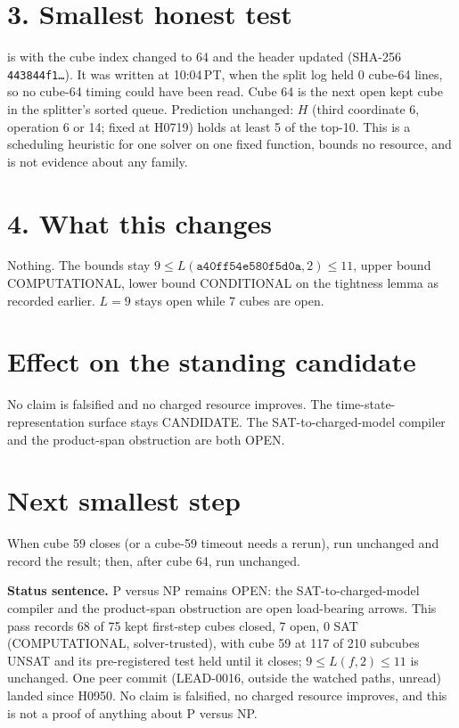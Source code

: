 \documentclass[11pt]{article}
\begin{document}
\section*{3. Smallest honest test}
 is  with the cube index changed to 64 and the header updated (SHA-256 \texttt{443844f1\ldots}). It was written at 10:04\,PT, when the split log held 0 cube-64 lines, so no cube-64 timing could have been read. Cube 64 is the next open kept cube in the splitter's sorted queue. Prediction unchanged: $H$ (third coordinate 6, operation 6 or 14; fixed at H0719) holds at least 5 of the top-10. This is a scheduling heuristic for one solver on one fixed function, bounds no resource, and is not evidence about any family.

\section*{4. What this changes}
Nothing. The bounds stay $9\le L(\texttt{a40ff54e580f5d0a},2)\le 11$, upper bound COMPUTATIONAL, lower bound CONDITIONAL on the tightness lemma as recorded earlier. $L=9$ stays open while 7 cubes are open.

\section*{Effect on the standing candidate}
No claim is falsified and no charged resource improves. The time-state-representation surface stays CANDIDATE. The SAT-to-charged-model compiler and the product-span obstruction are both OPEN.

\section*{Next smallest step}
When cube 59 closes (or a cube-59 timeout needs a rerun), run  unchanged and record the result; then, after cube 64, run  unchanged.

\bigskip
\noindent\textbf{Status sentence.} P versus NP remains OPEN: the SAT-to-charged-model compiler and the product-span obstruction are open load-bearing arrows. This pass records 68 of 75 kept first-step cubes closed, 7 open, 0 SAT (COMPUTATIONAL, solver-trusted), with cube 59 at 117 of 210 subcubes UNSAT and its pre-registered test held until it closes; $9\le L(f,2)\le 11$ is unchanged. One peer commit (LEAD-0016, outside the watched paths, unread) landed since H0950. No claim is falsified, no charged resource improves, and this is not a proof of anything about P versus NP.
\end{document}
